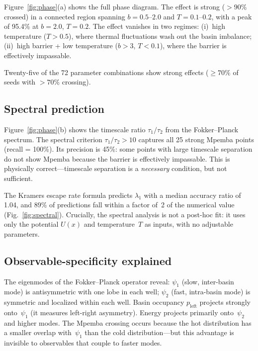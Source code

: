 \documentclass[aps,pre,reprint,superscriptaddress,showpacs]{revtex4-2}
\begin{document}
Figure~\ref{fig:phase}(a) shows the full phase diagram. The effect is strong
($>90\%$ crossed) in a connected region spanning $b = 0.5$--$2.0$ and
$T = 0.1$--$0.2$, with a peak of 95.4\% at $b = 2.0$, $T = 0.2$. The effect
vanishes in two regimes: (i)~high temperature ($T > 0.5$), where thermal
fluctuations wash out the basin imbalance; (ii)~high barrier + low temperature
($b > 3$, $T < 0.1$), where the barrier is effectively impassable.

Twenty-five of the 72 parameter combinations show strong effects ($\geq 70\%$
of seeds with $>70\%$ crossing).

\subsection{Spectral prediction}

Figure~\ref{fig:phase}(b) shows the timescale ratio $\tau_1/\tau_2$ from the
Fokker--Planck spectrum. The spectral criterion $\tau_1/\tau_2 > 10$ captures
all 25 strong Mpemba points (recall = 100\%). Its precision is 45\%: some
points with large timescale separation do not show Mpemba because the barrier
is effectively impassable. This is physically correct---timescale separation is
a \emph{necessary} condition, but not sufficient.

The Kramers escape rate formula predicts $\lambda_1$ with a median accuracy
ratio of 1.04, and 89\% of predictions fall within a factor of~2 of the
numerical value (Fig.~\ref{fig:spectral}). Crucially, the spectral analysis is
not a post-hoc fit: it uses only the potential $U(x)$ and temperature~$T$ as
inputs, with no adjustable parameters.

\subsection{Observable-specificity explained}

The eigenmodes of the Fokker--Planck operator reveal:
$\psi_1$ (slow, inter-basin mode) is antisymmetric with one lobe in each well;
$\psi_2$ (fast, intra-basin mode) is symmetric and localized within each well.
Basin occupancy $p_\mathrm{left}$ projects strongly onto~$\psi_1$ (it measures
left-right asymmetry). Energy projects primarily onto~$\psi_2$ and higher modes.
The Mpemba crossing occurs because the hot distribution has a smaller overlap
with~$\psi_1$ than the cold distribution---but this advantage is invisible to
observables that couple to faster modes.

\end{document}
